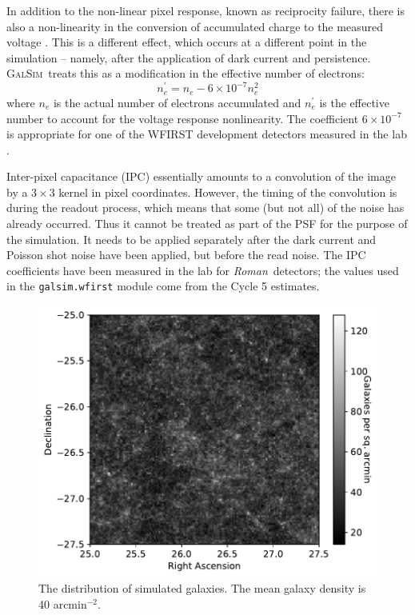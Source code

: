 \documentclass[usenatbib]{mnras}
\newcommand{\galsim}{\textsc{GalSim}}
\newcommand{\wfirst}{{\slshape Roman}}
\begin{document}
In addition to the non-linear pixel response, known as reciprocity failure, there is also a non-linearity in the conversion of accumulated charge to the measured voltage \citep{2017JInst..12C4009P,Biesiadzinski2011,10.1117/12.2314475}.
This is a different effect, which occurs at a different point in the simulation -- namely, after the application of dark current \citep{10.1117/12.790382,10.1117/12.2057308,10.1117/12.2233664} and persistence. 
\galsim\ treats this as a modification in the effective number of electrons:
\begin{equation}
n_e^\prime = n_e - 6 \times 10^{-7} n_e^2
\end{equation}
where $n_e$ is the actual number of electrons accumulated and $n_e^\prime$ is the effective number to account for the voltage response nonlinearity. The coefficient $6\times 10^{-7}$ is appropriate for one of the WFIRST development detectors measured in the lab \citep{2020PASP..132a4502C}.

Inter-pixel capacitance (IPC) \citep{2016PASP..128i5001K} essentially amounts to a convolution of the image by a $3 \times 3$ kernel in pixel coordinates.
However, the timing of the convolution is during the readout process, which means that some (but not all) of the noise has already occurred.  
Thus it cannot be treated as part of the PSF for the purpose of the simulation.  
It needs to be applied separately after the dark current and Poisson shot noise have been applied, but before the read noise.  
The IPC coefficients have been measured in the lab for \wfirst\ detectors; the values used in the \texttt{galsim.wfirst} module come from the Cycle 5 estimates. 

\begin{figure}
\begin{center}
\includegraphics[width=\columnwidth]{figures/galaxies.pdf}
\end{center}
\caption[]{
The distribution of simulated galaxies. The mean galaxy density is 40 arcmin$^{-2}$. 
\label{fig:galaxies}}
\end{figure}
\end{document}
